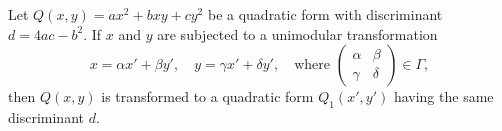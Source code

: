 Let $Q(x, y) = ax^2 + bxy + cy^2$ be a quadratic form with discriminant $d = 4ac - b^2$. If $x$ and $y$ are subjected to a unimodular transformation
$$x = \alpha x' + \beta y', \quad y = \gamma x' + \delta y', \quad \text{where } \begin{pmatrix} \alpha & \beta \\ \gamma & \delta \end{pmatrix} \in \Gamma,$$
then $Q(x, y)$ is transformed to a quadratic form $Q_1(x', y')$ having the same discriminant $d$.
